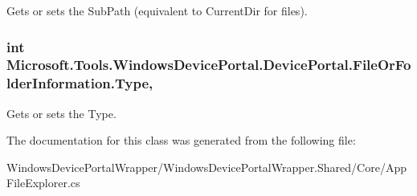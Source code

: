 Gets or sets the Sub\+Path (equivalent to Current\+Dir for files). 

\subsubsection[{\texorpdfstring{Type}{Type}}]{\setlength{\rightskip}{0pt plus 5cm}int Microsoft.\+Tools.\+Windows\+Device\+Portal.\+Device\+Portal.\+File\+Or\+Folder\+Information.\+Type\hspace{0.3cm}{\ttfamily [get]}, {\ttfamily [set]}}\hypertarget{class_microsoft_1_1_tools_1_1_windows_device_portal_1_1_device_portal_1_1_file_or_folder_information_a999e0227d76dc1426f46d49682383ae2}{}\label{class_microsoft_1_1_tools_1_1_windows_device_portal_1_1_device_portal_1_1_file_or_folder_information_a999e0227d76dc1426f46d49682383ae2}


Gets or sets the Type. 



The documentation for this class was generated from the following file\+:\begin{DoxyCompactItemize}
\item 
Windows\+Device\+Portal\+Wrapper/\+Windows\+Device\+Portal\+Wrapper.\+Shared/\+Core/App\+File\+Explorer.\+cs\end{DoxyCompactItemize}
